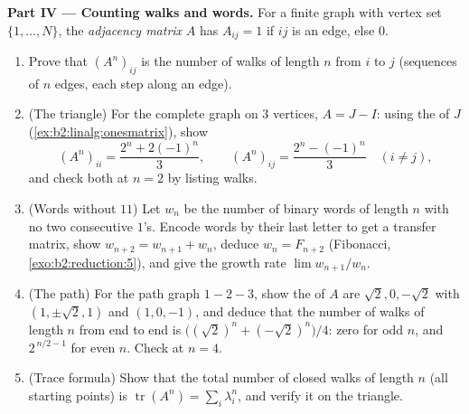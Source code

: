\begin{problem}
\medskip
\noindent\textbf{Part IV --- Counting walks and words.} For a
finite graph with vertex set $\{1, \dots, N\}$, the
\emph{adjacency matrix} $A$ has $A_{ij} = 1$ if $ij$ is an edge,
else $0$.
\begin{enumerate}[resume]
  \item Prove that $(A^n)_{ij}$ is the number of walks of length
        $n$ from $i$ to $j$ (sequences of $n$ edges, each step
        along an edge).
  \item (The triangle) For the complete graph on $3$ vertices,
        $A = J - I$: using the  of $J$
        (\cref{ex:b2:linalg:onesmatrix}), show
        \[
        (A^n)_{ii} = \frac{2^n + 2(-1)^n}{3},
        \qquad
        (A^n)_{ij} = \frac{2^n - (-1)^n}{3} \quad (i \neq j),
        \]
        and check both at $n = 2$ by listing walks.
  \item (Words without $11$) Let $w_n$ be the number of binary
        words of length $n$ with no two consecutive $1$'s.
        Encode words by their last letter to get a transfer
        matrix, show $w_{n+2} = w_{n+1} + w_n$, deduce $w_n =
        F_{n+2}$ (Fibonacci, \cref{exo:b2:reduction:5}), and
        give the growth rate $\lim w_{n+1}/w_n$.
  \item (The path) For the path graph $1 - 2 - 3$, show the
         of $A$ are $\sqrt2, 0, -\sqrt2$ with
         $(1, \pm\sqrt2, 1)$ and $(1, 0, -1)$, and
        deduce that the number of walks of length $n$ from end
        to end is $\bigl((\sqrt2)^n + (-\sqrt2)^n\bigr)/4$:
        zero for odd $n$, and $2^{\,n/2 - 1}$ for even $n$.
        Check at $n = 4$.
  \item (Trace formula) Show that the total number of closed
        walks of length $n$ (all starting points) is
        $\operatorname{tr}(A^n) = \sum_i \lambda_i^n$, and
        verify it on the triangle.
\end{enumerate}


\end{problem}
